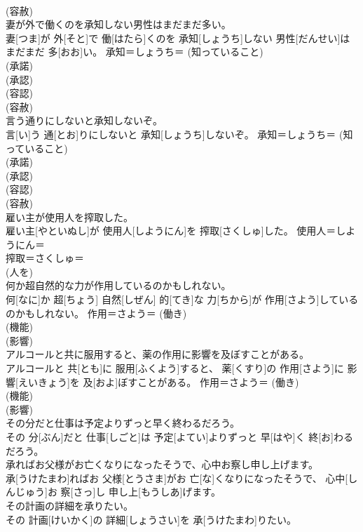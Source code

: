 \documentclass[8pt]{extreport}
\begin{document}
\begin{CJK}{UTF8}{min}
\\	(容赦)
\\	妻が外で働くのを承知しない男性はまだまだ多い。	
\\	妻[つま]が 外[そと]で 働[はたら]くのを 承知[しょうち]しない 男性[だんせい]はまだまだ 多[おお]い。	承知＝しょうち＝ (知っていること) 
\\	(承諾) 
\\	(承認) 
\\	(容認) 
\\	(容赦)
\\	言う通りにしないと承知しないぞ。	
\\	言[い]う 通[とお]りにしないと 承知[しょうち]しないぞ。	承知＝しょうち＝ (知っていること) 
\\	(承諾) 
\\	(承認) 
\\	(容認) 
\\	(容赦)
\\	雇い主が使用人を搾取した。	
\\	雇い主[やといぬし]が 使用人[しようにん]を 搾取[さくしゅ]した。	使用人＝しようにん＝ 
\\	搾取＝さくしゅ＝ 
\\	(人を) 
\\	何か超自然的な力が作用しているのかもしれない。	
\\	何[なに]か 超[ちょう] 自然[しぜん] 的[てき]な 力[ちから]が 作用[さよう]しているのかもしれない。	作用＝さよう＝ (働き) 
\\	(機能) 
\\	(影響) 
\\	アルコールと共に服用すると、薬の作用に影響を及ぼすことがある。	
\\	アルコールと 共[とも]に 服用[ふくよう]すると、 薬[くすり]の 作用[さよう]に 影響[えいきょう]を 及[およ]ぼすことがある。	作用＝さよう＝ (働き) 
\\	(機能) 
\\	(影響) 
\\	その分だと仕事は予定よりずっと早く終わるだろう。	
\\	その 分[ぶん]だと 仕事[しごと]は 予定[よてい]よりずっと 早[はや]く 終[お]わるだろう。	
\\	承ればお父様がお亡くなりになったそうで、心中お察し申し上げます。	
\\	承[うけたまわ]ればお 父様[とうさま]がお 亡[な]くなりになったそうで、 心中[しんじゅう]お 察[さっ]し 申し上[もうしあ]げます。	
\\	その計画の詳細を承りたい。	
\\	その 計画[けいかく]の 詳細[しょうさい]を 承[うけたまわ]りたい。	

\end{CJK}
\end{document}
